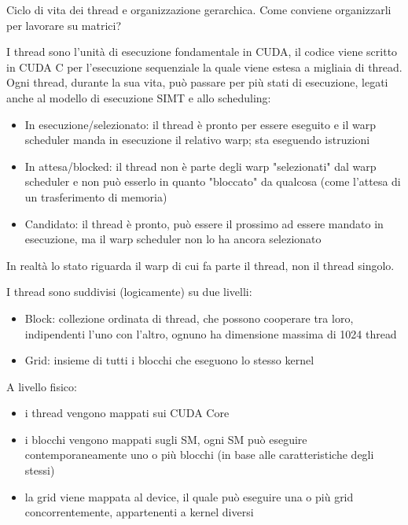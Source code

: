\begin{questions}
    \question Ciclo di vita dei thread e organizzazione gerarchica. Come conviene organizzarli per lavorare su matrici?
    
    \begin{solution}
    	I thread sono l'unità di esecuzione fondamentale in CUDA, il codice viene scritto in CUDA C per l'esecuzione sequenziale la quale viene estesa a migliaia di thread. Ogni thread, durante la sua vita, può passare per più stati di esecuzione, legati anche al modello di esecuzione SIMT e allo scheduling:
    	\begin{itemize}
    		\item In esecuzione/selezionato: il thread è pronto per essere eseguito e il warp scheduler manda in esecuzione il relativo warp; sta eseguendo istruzioni
    		
    		\item In attesa/blocked: il thread non è parte degli warp "selezionati" dal warp scheduler e non può esserlo in quanto "bloccato" da qualcosa (come l'attesa di un trasferimento di memoria)
    		
    		\item Candidato: il thread è pronto, può essere il prossimo ad essere mandato in esecuzione, ma il warp scheduler non lo ha ancora selezionato
    	\end{itemize}
    	In realtà lo stato riguarda il warp di cui fa parte il thread, non il thread singolo.
    	
    	I thread sono suddivisi (logicamente) su due livelli: 
    	\begin{itemize}
    		\item Block: collezione ordinata di thread, che possono cooperare tra loro, indipendenti l'uno con l'altro, ognuno ha dimensione massima di 1024 thread
    		
    		\item Grid: insieme di tutti i blocchi che eseguono lo stesso kernel
    	\end{itemize}
    	
    	A livello fisico: 
    	\begin{itemize}
    		\item i thread vengono mappati sui CUDA Core
    		
    		\item i blocchi vengono mappati sugli SM, ogni SM può eseguire contemporaneamente uno o più blocchi (in base alle caratteristiche degli stessi)
    		
    		\item la grid viene mappata al device, il quale può eseguire una o più grid concorrentemente, appartenenti a kernel diversi
    		

\end{itemize}
\end{solution}
\end{questions}
